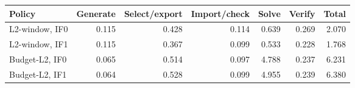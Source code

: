 \begin{tabular}{lrrrrrr}
\toprule
Policy & Generate & Select/export & Import/check & Solve & Verify & Total\\
\midrule
L2-window, IF0 & 0.115 & 0.428 & 0.114 & 0.639 & 0.269 & 2.070\\
L2-window, IF1 & 0.115 & 0.367 & 0.099 & 0.533 & 0.228 & 1.768\\
Budget-L2, IF0 & 0.065 & 0.514 & 0.097 & 4.788 & 0.237 & 6.231\\
Budget-L2, IF1 & 0.064 & 0.528 & 0.099 & 4.955 & 0.239 & 6.380\\
\bottomrule
\end{tabular}
